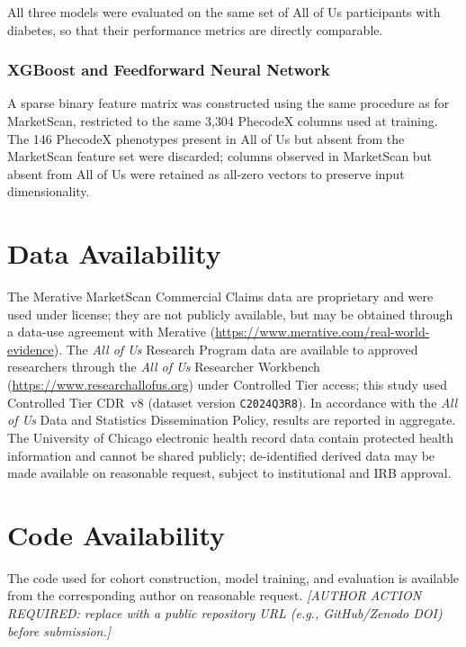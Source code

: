 \documentclass[12pt]{article}
\begin{document}
All three models were evaluated on the same set of All of Us participants with diabetes, so that their performance metrics are directly comparable.

\subsubsection{XGBoost and Feedforward Neural Network}

A sparse binary feature matrix was constructed using the same procedure as for MarketScan, restricted to the same 3{,}304 PhecodeX columns used at training. The 146 PhecodeX phenotypes present in All of Us but absent from the MarketScan feature set were discarded; columns observed in MarketScan but absent from All of Us were retained as all-zero vectors to preserve input dimensionality.

\section*{Data Availability}

The Merative MarketScan Commercial Claims data are proprietary and were used under license; they are not publicly available, but may be obtained through a data-use agreement with Merative (\url{https://www.merative.com/real-world-evidence}). The \textit{All of Us} Research Program data are available to approved researchers through the \textit{All of Us} Researcher Workbench (\url{https://www.researchallofus.org}) under Controlled Tier access; this study used Controlled Tier CDR~v8 (dataset version \texttt{C2024Q3R8}). In accordance with the \textit{All of Us} Data and Statistics Dissemination Policy, results are reported in aggregate. The University of Chicago electronic health record data contain protected health information and cannot be shared publicly; de-identified derived data may be made available on reasonable request, subject to institutional and IRB approval.

\section*{Code Availability}

The code used for cohort construction, model training, and evaluation is available from the corresponding author on reasonable request. \emph{[AUTHOR ACTION REQUIRED: replace with a public repository URL (e.g., GitHub/Zenodo DOI) before submission.]}
\end{document}
